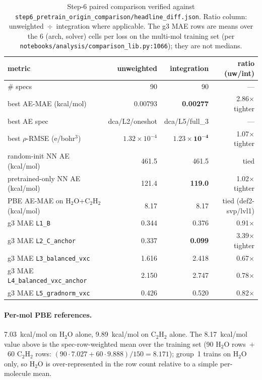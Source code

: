 \documentclass[11pt,letterpaper]{article}
\begin{document}
\begin{table}[h]
\centering
\caption{Step-6 paired comparison verified against
\texttt{step6\_pretrain\_origin\_comparison/headline\_diff.json}. Ratio
column: unweighted~$\div$~integration where applicable. The g3 MAE
rows are means over the 6 (arch, solver) cells per loss on the
multi-mol training set (per
\texttt{notebooks/analysis/comparison\_lib.py:1066}); they are not
medians.}
\label{S:tab:step6_paired}
\small
\begin{tabular}{lrrr}
\toprule
metric & unweighted & integration & ratio (uw/int) \\
\midrule
\# specs & 90 & 90 & --- \\
best AE-MAE (kcal/mol) & 0.00793 & \textbf{0.00277} & 2.86$\times$ tighter \\
best AE spec & dca/L2/oneshot & dca/L5/full\_3 & --- \\
best $\rho$-RMSE (e/bohr$^3$) & $1.32\!\times\!10^{-4}$ & $\mathbf{1.23\!\times\!10^{-4}}$ & 1.07$\times$ tighter \\
random-init NN AE (kcal/mol) & 461.5 & 461.5 & tied \\
pretrained-only NN AE (kcal/mol) & 121.4 & \textbf{119.0} & 1.02$\times$ tighter \\
PBE AE-MAE on H$_2$O+C$_2$H$_2$ (kcal/mol) & 8.17 & 8.17 & tied (def2-svp/lvl1) \\
\midrule
g3 MAE \texttt{L1\_B} & 0.344 & 0.376 & 0.91$\times$ \\
g3 MAE \texttt{L2\_C\_anchor} & 0.337 & \textbf{0.099} & 3.39$\times$ tighter \\
g3 MAE \texttt{L3\_balanced\_vxc} & 1.616 & 2.418 & 0.67$\times$ \\
g3 MAE \texttt{L4\_balanced\_vxc\_anchor} & 2.150 & 2.747 & 0.78$\times$ \\
g3 MAE \texttt{L5\_gradnorm\_vxc} & 0.426 & 0.520 & 0.82$\times$ \\
\bottomrule
\end{tabular}
\end{table}

\paragraph{Per-mol PBE references.} 7.03~kcal/mol on H$_2$O alone,
9.89~kcal/mol on C$_2$H$_2$ alone. The 8.17~kcal/mol value above is the
spec-row-weighted mean over the training set (90 H$_2$O rows~$+$~60
C$_2$H$_2$ rows: $(90 \cdot 7.027 + 60 \cdot 9.888)/150 = 8.171$); group~1
trains on H$_2$O only, so H$_2$O is over-represented in the row count
relative to a simple per-molecule mean.
\end{document}
